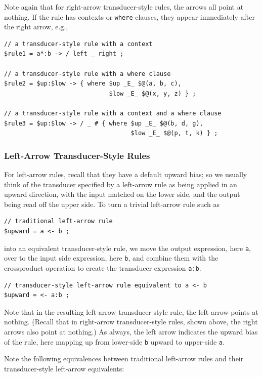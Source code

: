 Note again that for right-arrow transducer-style rules, the arrows all point at nothing.  If the rule
has contexts or \texttt{where} clauses, they appear immediately after
the right arrow, e.g.,

\begin{Verbatim}
// a transducer-style rule with a context
$rule1 = a*:b -> / left _ right ;

// a transducer-style rule with a where clause
$rule2 = $up:$low -> { where $up _E_ $@(a, b, c),
                             $low _E_ $@(x, y, z) } ;

// a transducer-style rule with a context and a where clause
$rule3 = $up:$low -> / _ # { where $up _E_ $@(b, d, g),
                                   $low _E_ $@(p, t, k) } ;
\end{Verbatim}

\subsubsection{Left-Arrow Transducer-Style Rules}

For left-arrow rules, recall that they have a default upward bias; so we usually think of the transducer
specified by a left-arrow rule as being applied in an upward direction, with the input matched on the
lower side, and the output being read off the upper side.  To turn a trivial left-arrow rule such as

\begin{Verbatim}
// traditional left-arrow rule
$upward = a <- b ;
\end{Verbatim}

\noindent
into an equivalent transducer-style rule, we move the output expression, here \verb!a!, over to the
input side expression, here \verb!b!, and combine them with the crossproduct operation to create the
transducer expression \verb!a:b!.  

\begin{Verbatim}
// transducer-style left-arrow rule equivalent to a <- b
$upward = <- a:b ;
\end{Verbatim}

\noindent
Note that in the resulting left-arrow transducer-style rule, the left arrow points at nothing.
(Recall that in right-arrow transducer-style rules, shown above, the right arrows also point at
nothing.)  As always, the left arrow indicates the upward bias of the rule, here mapping up from
lower-side \verb!b! upward to upper-side \verb!a!.

Note the following equivalences between traditional left-arrow rules and their
transducer-style left-arrow equivalents:

